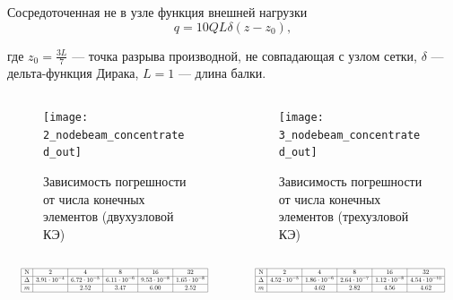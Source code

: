 \documentclass[7pt]{beamer}
\numberwithin{equation}{section}
\newcommand*{\Scale}[2][4]{\scalebox{#1}{$#2$}}
\begin{document}
	\begin{frame}{}
	\begin{block}{Сосредоточенная не в узле функция внешней нагрузки}
		\[q = 10 Q L  \delta (z - z_{0}),\]
	\end{block}
	где $z_{0}=\frac{3L}{7}$ --- точка разрыва производной, не совпадающая с узлом сетки, $\delta$ --- дельта-функция Дирака, $L=1$ --- длина балки. 
	\begin{columns}
		\begin{column}{0.57\textwidth}
			\begin{figure}[H]
				\centering
				\texttt{[image: 2\_nodebeam\_concentrated\_out]}
				\caption{Зависимость погрешности от числа конечных элементов (двухузловой КЭ)}
				\label{fig:2_nodebeam_concentrated_out}
			\end{figure}
		\end{column}
		\begin{column}{0.57\textwidth}
			\begin{figure}[H]
				\centering
				\texttt{[image: 3\_nodebeam\_concentrated\_out]}
				\caption{Зависимость погрешности от числа конечных элементов (трехузловой КЭ)}
				\label{fig:3_nodebeam_concentrated_out}
			\end{figure}
		\end{column}
	\end{columns}
	\begin{columns}
		\begin{column}{0.5\textwidth}
			\[
				\Scale[0.5] {
						\begin{array}{|c|c|c|c|c|c|}
							\hline
							\text{N} & 2 & 4 & 8 & 16 & 32\\ \hline
				\Delta  &3.91 \cdot 10^{-4} & 6.72 \cdot 10^{-5} & 6.11 \cdot 10^{-6} & 9.53 \cdot 10^{-8} & 1.65 \cdot 10^{-8} \\ \hline
				m  &  & 2.52 & 3.47 & 6.00 & 2.52 \\ 
							\hline
								\end{array}
				}
			\]
		\end{column}
		\begin{column}{0.5\textwidth}
			\[
					\Scale[0.5] {
			\begin{array}{|c|c|c|c|c|c|}
			\hline
			\text{N} & 2 & 4 & 8 & 16 & 32\\ \hline
				\Delta  & 4.52 \cdot 10^{-5} & 1.86 \cdot 10^{-6} & 2.64 \cdot 10^{-7} & 1.12 \cdot 10^{-8} & 4.54 \cdot 10^{-10} \\ \hline
				m  &  &  4.62 & 2.82 & 4.56 & 4.62 \\ 
			\hline
			\end{array}
				}
				\]
		\end{column}
	\end{columns}
\end{frame}
\end{document}
